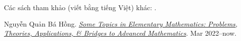 \documentclass{article}
\numberwithin{equation}{section}
\begin{document}

Các sách tham khảo (viết bằng tiếng Việt) khác: \cite{Trong_Toan_6_2021}.

\begin{thebibliography}{99}
	 Nguyễn Quản Bá Hồng. \href{https://github.com/NQBH/hobby/blob/master/elementary_mathematics/NQBH_elementary_mathematics.pdf}{\textit{Some Topics in Elementary Mathematics: Problems, Theories, Applications, \textit{\&} Bridges to Advanced Mathematics}}. Mar 2022--now.
\end{thebibliography}


\printbibliography[heading=bibintoc]
	
\end{document}
